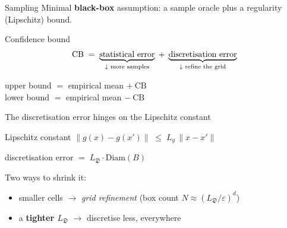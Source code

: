 \documentclass{beamer}
\newcommand{\drift}{\mathfrak{D}}          %
\newcommand{\Diam}{\mathrm{Diam}}
\begin{document}
\begin{frame}{Sampling}
  Minimal \textbf{black-box} assumption: a sample oracle plus a regularity (Lipschitz) bound.
  \vspace{3mm}
  \begin{block}{Confidence bound}\centering
    \[
      \mathrm{CB} \;=\;
      \underbrace{\text{statistical error}}_{\text{\scriptsize$\downarrow$ more samples}}
      \;+\;
      \underbrace{\text{discretisation error}}_{\text{\scriptsize$\downarrow$ refine the grid}}
    \]
  \end{block}
  \vspace{2mm}
  \begin{center}
    upper bound $=$ empirical mean $+\ \mathrm{CB}$\\[1.5mm]
    lower bound $=$ empirical mean $-\ \mathrm{CB}$
  \end{center}
\end{frame}

\begin{frame}{The discretisation error hinges on the Lipschitz constant}
  \begin{block}{Lipschitz constant}\centering
    $\lVert g(x) - g(x')\rVert \;\le\; L_g\,\lVert x - x'\rVert$
  \end{block}
  \begin{block}{}\centering
    discretisation error $=\; L_\drift \cdot \Diam(B)$
  \end{block}
  Two ways to shrink it:
  \begin{itemize}
    \item smaller cells $\rightarrow$ \emph{grid refinement} \hfill (box count $N \approx (L_\drift/\varepsilon)^{d}$)
    \item a \textbf{tighter $L_\drift$} $\rightarrow$ discretise less, everywhere
  \end{itemize}
  \vspace{1mm}
\end{frame}




\end{document}
